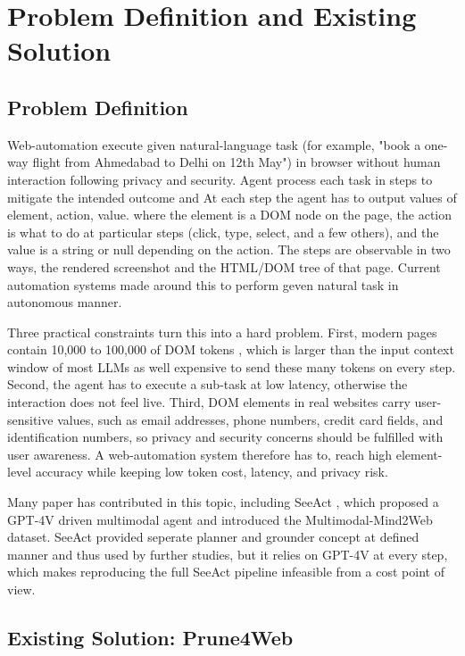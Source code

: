 \section{Problem Definition and Existing Solution}

\subsection{Problem Definition}
Web-automation execute given natural-language task (for example, "book a one-way flight from Ahmedabad to Delhi on 12th May") in browser without human interaction following privacy and security. Agent process each task in steps to mitigate the intended outcome and At each step the agent has to output values of element, action, value. where the element is a DOM node on the page, the action is what to do at particular steps (click, type, select, and a few others), and the value is a string or null depending on the action. The steps are observable in two ways, the rendered screenshot and the HTML/DOM tree of that page. Current automation systems made around this to perform geven natural task in autonomous manner.

Three practical constraints turn this into a hard problem. First, modern pages contain 10,000 to 100,000 of DOM tokens \cite{zhang2025prune4web}, which is larger than the input context window of most LLMs as well expensive to send these many tokens on every step. Second, the agent has to execute a sub-task at low latency, otherwise the interaction does not feel live. Third, DOM elements in real websites carry user-sensitive values, such as email addresses, phone numbers, credit card fields, and identification numbers, so privacy and security concerns should be fulfilled with user awareness. A web-automation system therefore has to, reach high element-level accuracy while keeping low token cost, latency, and privacy risk.

Many paper has contributed in this topic, including SeeAct \cite{SeeAct}, which proposed a GPT-4V driven multimodal agent and introduced the Multimodal-Mind2Web dataset. SeeAct provided seperate planner and grounder concept at defined manner and thus used by further studies, but it relies on GPT-4V at every step, which makes reproducing the full SeeAct pipeline infeasible from a cost point of view.  

\subsection{Existing Solution: Prune4Web}

